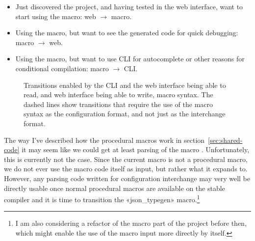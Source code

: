 \begin{itemize}
  \item Just discovered the project, and having tested in the web interface, want to start using the macro: web $\rightarrow$ macro.
  \item Using the macro, but want to see the generated code for quick debugging: macro $\rightarrow$ web.
  \item Using the macro, but want to use CLI for autocomplete or other reasons for conditional compilation: macro $\rightarrow$ CLI.
\end{itemize}

\begin{figure}[ht!]
\vspace{2mm}
\centering
{}
\vspace{2mm}
\caption[Transitions from reading and writing macro syntax]{Transitions enabled by the CLI and the web interface being able to read, and web interface being able to write, macro syntax. The dashed lines show transitions that require the use of the macro syntax as the configuration format, and not just as the interchange format.}
\label{fig:transitions}
\end{figure}

The way I've described how the procedural macros work in section~\ref{sec:shared-code} it may seem like we could get at least parsing of the macro . Unfortunately, this is currently not the case. Since the current macro is not a procedural macro, we do not ever use the macro code itself as input, but rather what it expands to. However, any parsing code written for configuration interchange may very well be directly usable once normal procedural macros are available on the stable compiler and it is time to transition the «json_typegen» macro.\footnote{I am also considering a refactor of the macro part of the project before then, which might enable the use of the macro input more directly by itself.}

